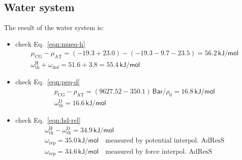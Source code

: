 \documentclass[aip,jcp,a4paper,reprint,onecolumn]{revtex4-1}
\newcommand{\AT}{{\textrm{{AT}}}}
\newcommand{\CG}{{\textrm{CG}}}
\newcommand{\thf}{{\textrm{th}}}
\newcommand{\dof}{{\textrm{dof}}}
\newcommand{\res}{{\textrm{rep}}}
\newcommand{\hadress}{{\textrm{H}}}
\newcommand{\dadress}{{\textrm{D}}}
\begin{document}
\subsection{Water system}
The result of the water system is:
\begin{itemize}
\item check Eq.~\eqref{eqn:mueq-h}
  \begin{align}
    &\mu_\CG - \mu_\AT = (-19.3 + 23.0) - (-19.3-9.7-23.5) = 56.2 \,\textsf{kJ/mol}\\
    &\omega^\hadress_\thf + \omega_\dof = 51.6 + 3.8 = 55.4  \,\textsf{kJ/mol}
  \end{align}
\item check Eq.~\eqref{eqn:peq-d}
  \begin{align}
    &p_\CG - p_\AT = (9627.52 - 350.1) \,\textsf{Bar} / \rho_0 = 16.8  \,\textsf{kJ/mol} \\
    &\omega^\dadress_\thf = 16.6  \,\textsf{kJ/mol}
  \end{align}
\item check Eq.~\eqref{eqn:hd-rel}
  \begin{align}
    &\omega^\hadress_\thf - \omega^\dadress_\thf = 34.9 \,\textsf{kJ/mol}\\
    &\omega_\res = 35.0 \,\textsf{kJ/mol} \quad \textrm{measured by potential interpol. AdResS}\\
    &\omega_\res = 34.6 \,\textsf{kJ/mol} \quad \textrm{measured by force interpol. AdResS}
  \end{align}
\end{itemize}


\end{document}

